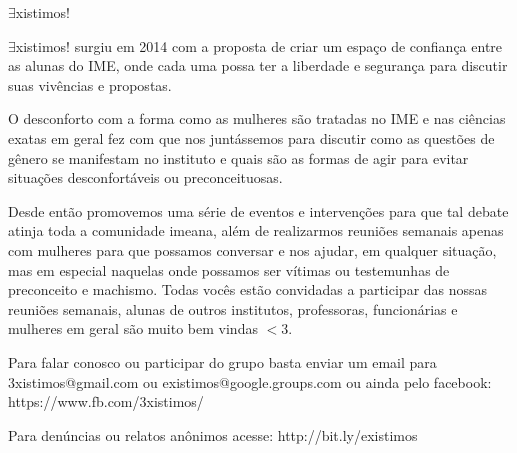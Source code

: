 \begin{subsecao}{$\exists$xistimos!}


$\exists$xistimos! surgiu em  2014 com a proposta de criar um espaço de
confiança entre as alunas do IME, onde cada uma possa ter a liberdade e
segurança para discutir suas vivências e propostas.

O desconforto com a forma como as mulheres são tratadas no IME e nas ciências
exatas em geral fez com que nos juntássemos para discutir como as questões de
gênero se manifestam no instituto e quais são as formas de agir para evitar
situações desconfortáveis ou preconceituosas.

Desde então promovemos uma série de eventos e intervenções para que tal debate
atinja toda a comunidade imeana, além de realizarmos reuniões semanais apenas
com mulheres para que possamos conversar e nos ajudar, em qualquer situação,
mas em especial naquelas onde possamos ser vítimas ou testemunhas de preconceito e
machismo. Todas vocês estão convidadas a participar das nossas  reuniões semanais, 
alunas de outros institutos, professoras, funcionárias e mulheres
em geral são muito bem vindas $<$3. 

Para falar conosco ou participar do grupo basta enviar um email
para 3xistimos@gmail.com ou existimos@google.groups.com ou ainda pelo facebook:
https://www.fb.com/3xistimos/

Para denúncias ou relatos anônimos acesse: http://bit.ly/existimos
\end{subsecao}
